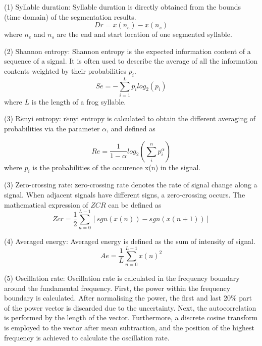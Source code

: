 \noindent(1) Syllable duration: Syllable duration \citep{Xie1504:Acoustic} is directly obtained from the bounds (time domain) of the segmentation results.
\begin{equation}
Dr = x(n_{e}) - x(n_{s})
\end{equation}
where $n_{e}$ and $n_{s}$ are the end and start location of one segmented syllable.

\vspace{3mm}

\noindent(2) Shannon entropy: Shannon entropy is the expected information content of a sequence of a signal. It is often used to describe the average of all the information contents weighted by their probabilities $p_{i}$.
\begin{equation}
Se=-\sum_{i=1}^{L}p_{i}log_{2}(p_{i})
\end{equation}
where $L$ is the length of a frog syllable.

\vspace{3mm}

\noindent(3) R$\acute{e}$nyi entropy: r$\acute{e}$nyi entropy is calculated to obtain the different averaging of probabilities via the parameter $\alpha$, and defined as

\begin{equation}
Re=\frac{1}{1-\alpha}log_{2}(\sum_{i}^{n}p_{i}^{\alpha})
\end{equation}
where $p_{i}$ is the probabilities of the occurence x(n) in the signal.

\vspace{3mm}

\noindent(3) Zero-crossing rate: zero-crossing rate denotes the rate of signal change along a signal. When adjacent signals have different signs, a zero-crossing occurs. The mathematical expression of $ZCR$ can be defined as
\begin{equation}
Zcr=\frac{1}{2}\sum_{n=0}^{L-1}[sgn(x(n))-sgn(x(n+1))]
\end{equation}

\vspace{3mm}

\noindent(4) Averaged energy: Averaged energy is defined as the sum of intensity of signal.
\begin{equation}
Ae = \frac{1}{L}\sum_{n=0}^{L-1}x(n)^{2}
\end{equation}


\vspace{3mm}
\noindent(5) Oscillation rate: Oscillation rate is calculated in the frequency boundary around the fundamental frequency. First, the power within the frequency boundary is calculated. After normalising the power, the first and last 20\% part of the power vector is discarded due to the uncertainty. Next, the autocorrelation is performed by the length of the vector. Furthermore, a discrete cosine transform is employed to the vector after mean subtraction, and the position of the highest frequency is achieved to calculate the oscillation rate. 

